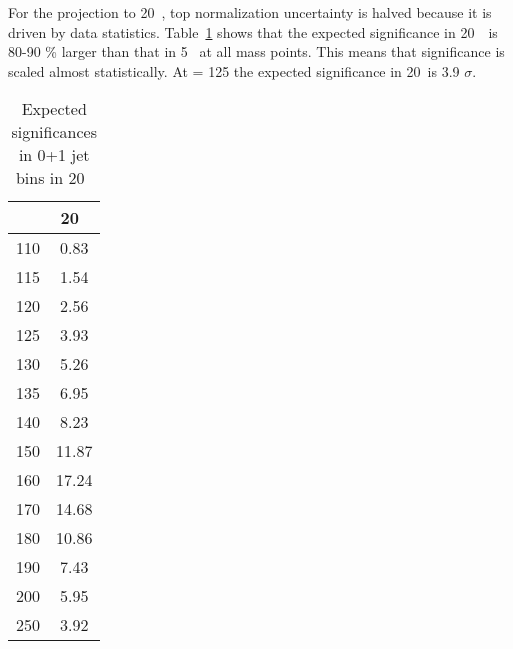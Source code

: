 For the projection to 20~\ifb, top normalization uncertainty is halved
because it is driven by data statistics. Table~\ref{tab:exp_sig_20fb} shows
that the expected significance in 20~\ifb~is 80-90 \% larger than that in 5~\ifb
at all mass points. This means that significance is scaled almost statistically.
At \mHi = 125 \GeV the expected  significance in 20~\ifb is 3.9 $\sigma$.

\begin{table}[htb] 
	\centering
	\begin{tabular}{c | c  }
   	\hline \hline
	\mHi & 20~\ifb \\
	\hline 
	110 &   0.83 	\\
	115 &   1.54	\\
	120 &   2.56 	\\
	125 &   3.93 	\\
	130 &   5.26 	\\
	135 &   6.95	\\
	140 &   8.23 	\\
	150 &   11.87 	\\
	160 &   17.24 	\\
	170 &   14.68 	\\
	180 &   10.86 	\\
	190 &   7.43 	\\
	200 &   5.95 	\\
	250 &   3.92 	\\
	\hline \hline
	\end{tabular}
	\caption{Expected significances in 0+1 jet bins in 20~\ifb}
	\label{tab:exp_sig_20fb}
\end{table} 
